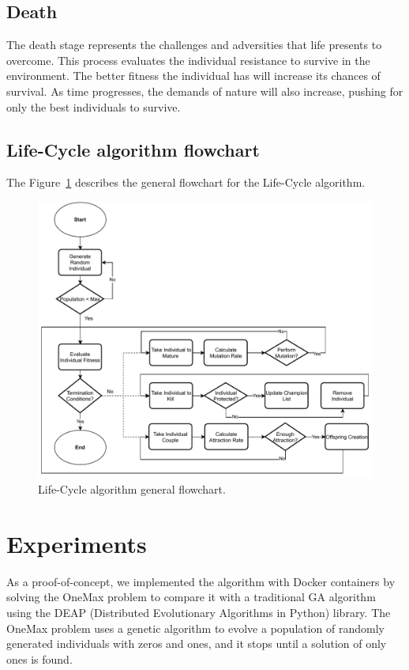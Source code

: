\documentclass[runningheads]{llncs}
\begin{document}
\subsection{Death}

The death stage represents the challenges and adversities that life presents to
overcome. This process evaluates the individual resistance to survive in the
environment. The better fitness the individual has will increase its chances of
survival. As time progresses, the demands of nature will also increase, pushing
for only the best individuals to survive.

\subsection{Life-Cycle algorithm flowchart}

The Figure~\ref{fig4} describes the general flowchart for the Life-Cycle algorithm.

\begin{figure}
    \includegraphics[width=\textwidth]{img/fig4_flowchart.pdf}
    \caption{Life-Cycle algorithm general flowchart.} \label{fig4}
    \end{figure}


\section{Experiments} 

As a proof-of-concept, we implemented the algorithm with Docker containers by
solving the OneMax problem to compare it with a traditional GA algorithm using
the DEAP (Distributed Evolutionary Algorithms in Python) library. The OneMax
problem uses a genetic algorithm to evolve a population of randomly generated
individuals with zeros and ones, and it stops until a solution of only ones is
found.
\end{document}
